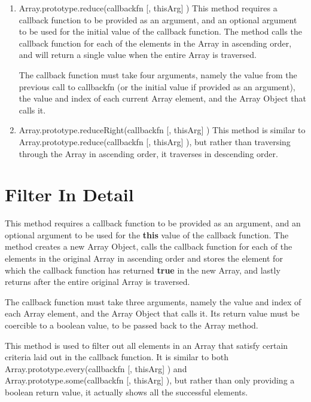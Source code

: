 \documentclass[a4paper,11pt,twoside]{report}
\begin{document}
\begin{enumerate}
\item Array.prototype.reduce(callbackfn [, thisArg] ) \newline
This method requires a callback function to be provided as an argument, and an optional argument to be used for the initial value of the callback function. The method calls the callback function for each of the elements in the Array in ascending order, and will return a single value when the entire Array is traversed. 

The callback function must take four arguments, namely the value from the previous call to callbackfn (or the initial value if provided as an argument), the value and index of each current Array element, and the Array Object that calls it. 

\item Array.prototype.reduceRight(callbackfn [, thisArg] ) \newline
This method is similar to Array.prototype.reduce(callbackfn [, thisArg] ), but rather than traversing through the Array in ascending order, it traverses in descending order.
\end{enumerate}

\section{Filter In Detail}\label{sec:filter}
This method requires a callback function to be provided as an argument, and an optional argument to be used for the \textbf{this} value of the callback function. The method creates a new Array Object, calls the callback function for each of the elements in the original Array in ascending order and stores the element for which the callback function has returned \textbf{true} in the new Array, and lastly returns after the entire original Array is traversed. 

The callback function must take three arguments, namely the value and index of each Array element, and the Array Object that calls it. Its return value must be coercible to a boolean value, to be passed back to the Array method.

This method is used to filter out all elements in an Array that satisfy certain criteria laid out in the callback function. It is similar to both Array.prototype.every(callbackfn [, thisArg] ) and Array.prototype.some(callbackfn [, thisArg] ), but rather than only providing a boolean return value, it actually shows all the successful elements.
\end{document}
